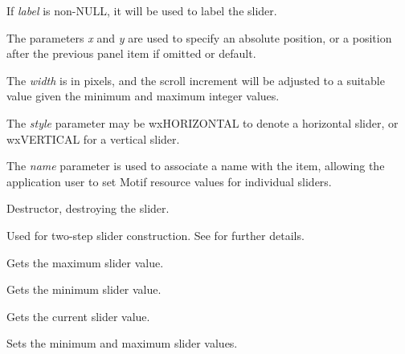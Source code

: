 If {\it label} is non-NULL, it will be used to label the slider.

The parameters {\it x} and {\it y} are used to specify an absolute
position, or a position after the previous panel item if omitted or
default.

The {\it width} is in pixels, and the scroll increment will be adjusted
to a suitable value given the minimum and maximum integer values.

The {\it style} parameter may be wxHORIZONTAL to denote a horizontal
slider, or wxVERTICAL for a vertical slider.

The {\it name} parameter is used to associate a name with the item,
allowing the application user to set Motif resource values for
individual sliders.



Destructor, destroying the slider.



Used for two-step slider construction. See \rtfsp
for further details.



Gets the maximum slider value.



Gets the minimum slider value.



Gets the current slider value.



Sets the minimum and maximum slider values.

